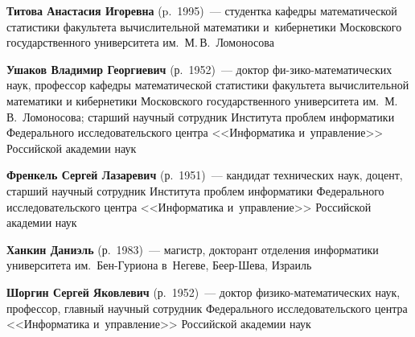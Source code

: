 \begin{multicols}{2}
\vspace*{3pt}

\noindent
\textbf{Титова Анастасия Игоревна} (p.\ 1995)~--- 
студентка кафедры математической статистики факультета вычисли\-тель\-ной математики 
и~кибернетики Московского государственного университета им.\ М.\,В.~Ломоносова 


\vspace*{3pt}


\noindent
\textbf{Ушаков Владимир Георгиевич} (р.\ 1952)~--- 
доктор фи-\linebreak зи\-ко-ма\-те\-ма\-ти\-че\-ских наук, профессор кафедры математической 
статистики факультета вычислительной математики и кибернетики Московского\linebreak 
государственного университета им.\ М.\,В.~Ло\-мо\-носова; 
старший научный со\-труд\-ник Института проб\-лем информатики Федерального 
исследовательского центра <<Информатика и~управ\-ле\-ние>> Российской академии наук


\vspace*{3pt}



\noindent
\textbf{Френкель Сергей Лазаревич} (р.\ 1951)~--- 
кандидат технических наук, доцент, старший научный сотрудник Института проб\-лем 
информатики Федерального исследовательского центра <<Информатика 
и~управ\-ле\-ние>> Российской академии наук


\vspace*{3pt}


\noindent
\textbf{Ханкин Даниэль} (р.\ 1983)~--- 
магистр, докторант отделения информатики университета им.\
 Бен-Гу\-ри\-она в~Негеве, Беер-Шева, Израиль
 
 \vspace*{3pt}


\noindent
\textbf{Шоргин Сергей Яковлевич} (р.\ 1952)~--- 
доктор фи\-зи\-ко-ма\-те\-ма\-ти\-че\-ских наук, профессор, главный научный 
со\-труд\-ник Федерального исследовательского центра <<Информатика и~управ\-ле\-ние>> 
Российской академии наук










 \label{end\stat}






\end{multicols}

\newpage